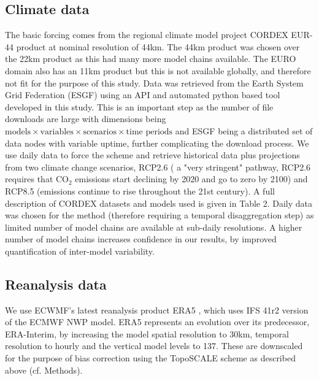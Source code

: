 \documentclass[hess, manuscript]{copernicus}
\begin{document}
\subsection{Climate data}
The basic forcing comes from the regional climate model project CORDEX EUR-44 product \citep{Jacob2014-yw} at nominal resolution of 44\unit{km}. The 44\unit{km} product was chosen over the 22\unit{km} product as this had many more model chains available. The EURO domain also has an 11\unit{km} product but this is not available globally, and therefore not fit for the purpose of this study. Data was retrieved from the Earth System Grid Federation (ESGF) using an API and automated python based tool developed in this study. This is an important step as the number of file downloads are large with dimensions being $\text{models}\times\text{variables}\times\text{scenarios}\times\text{time periods}$
and ESGF being a distributed set of data nodes with variable uptime, further complicating the download process. 
We use daily data to force the scheme and retrieve historical data plus projections from two climate change scenarios, RCP2.6 ( a "very stringent" pathway, RCP2.6 requires that  $\text{CO}_2$ emissions start declining by 2020 and go to zero by 2100) and RCP8.5 (emissions continue to rise throughout the 21st century). A full description of CORDEX datasets and models used is given in Table 2. Daily data was chosen for the method (therefore requiring a temporal disaggregation step) as limited number of model chains are available at sub-daily resolutions. A higher number of model chains  increases confidence in our results, by improved quantification of inter-model variability.

\subsection{Reanalysis data}
We use ECWMF's latest reanalysis product ERA5 \citep{Hersbach2020-ze}, which uses IFS 41r2 version of the ECMWF NWP model. ERA5 represents an evolution over its predecessor, ERA-Interim, by increasing the model spatial resolution to 30\unit{km}, temporal resolution to hourly and the vertical model levels to 137. These are downscaled for the purpose of bias correction using the TopoSCALE scheme \citep{Fiddes2014-wt} as described above (cf. Methods). %
\end{document}
